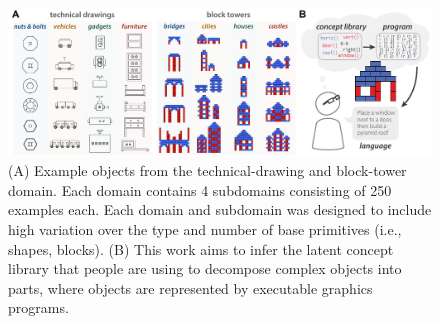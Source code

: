 \documentclass[10pt,letterpaper]{article}
\begin{document}
\begin{figure}[h]
  \begin{center}
  \includegraphics[width=0.99\linewidth]{figures/lax_task.pdf}
  \caption{(A) Example objects from the technical-drawing and block-tower domain. Each domain contains 4 subdomains consisting of 250 examples each. Each domain and subdomain was designed to include high variation over the type and number of base primitives (i.e., shapes, blocks). (B) This work aims to infer the latent concept library that people are using to decompose complex objects into parts, where objects are represented by executable graphics programs.}
  \label{fig:task}
  \end{center}
 \end{figure}



\end{document}
